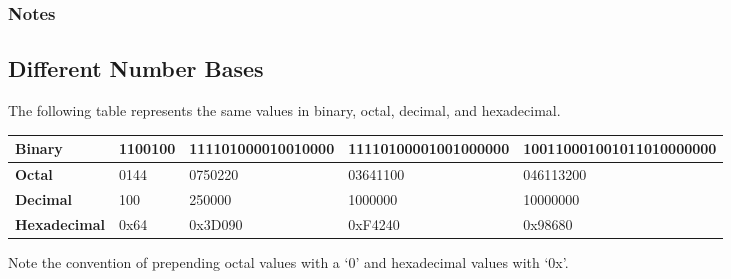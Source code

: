     \subsubsection*{Notes}

    \vfill

    
    \pagebreak
    
    \subsection*{Different Number Bases}
    The following table represents the same values in binary, octal, decimal, and hexadecimal.

    \smallskip
    \begin{tabularx}{\boxwidth}{| >{\bfseries\arraybackslash}p{0.125\boxwidth} | X | X | X | X |}
        \hline
        Binary & 1100100 & {\footnotesize 111101000010010000} & {\footnotesize 11110100001001000000} & {\footnotesize 100110001001011010000000} \\\hline
        Octal & 0144 & 0750220 & 03641100 & 046113200 \\\hline
        Decimal & 100 & 250000 & 1000000 & 10000000 \\\hline
        Hexadecimal & 0x64 & 0x3D090 & 0xF4240 & 0x98680 \\\hline
    \end{tabularx}

    \smallskip
    Note the convention of prepending octal values with a `0' and hexadecimal values with `0x'.

